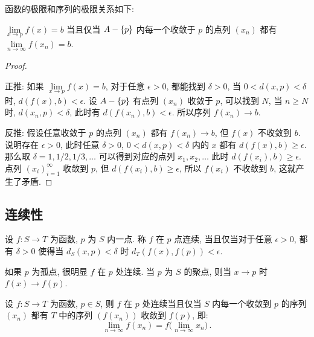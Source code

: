 \documentclass[UTF8]{ctexart}
\theoremstyle{mystyle}
\DeclarePairedDelimiter\set{\lbrace}{\rbrace}
\begin{document}
函数的极限和序列的极限关系如下:
\begin{proposition}
    $ \lim\limits_{x \to p} f(x) = b $ 当且仅当 $ A - \set{p} $ 内每一个收敛于 $ p $ 的点列 $ (x_n) $ 都有 $ \lim\limits_{n \to \infty} f(x_n) = b $.
\end{proposition}

\begin{proof} \ 

    正推: 如果 $ \lim\limits_{x \to p} f(x) = b $, 对于任意 $ \epsilon > 0 $, 都能找到 $ \delta > 0 $, 当 $ 0 < d(x, p) < \delta $ 时, $ d(f(x), b) < \epsilon $. 设 $ A - \set{p} $ 有点列 $ (x_n) $ 收敛于 $ p $, 可以找到 $ N $, 当 $ n \geqslant N $ 时, $ d(x_n, p) < \delta $, 此时有 $ d(f(x_n), b) < \epsilon $. 所以序列 $ f(x_n) \to b $.

    反推: 假设任意收敛于 $ p $ 的点列 $ (x_n) $ 都有 $ f(x_n) \to b $, 但 $ f(x) $ 不收敛到 $ b $. 说明存在 $ \epsilon > 0 $, 此时任意 $ \delta > 0 $, $ 0 < d(x, p) < \delta $ 内的 $ x $ 都有 $ d(f(x), b) \geqslant \epsilon $. 那么取 $ \delta = 1, 1/2, 1/3, \dots $ 可以得到对应的点列 $ x_1, x_2, \dots $ 此时 $ d(f(x_i), b) \geqslant \epsilon $. 点列 $ (x_i)_{i = 1}^{\infty} $ 收敛到 $ p $, 但 $ d(f(x_i), b) \geqslant \epsilon $, 所以 $ f(x_i) $ 不收敛到 $ b $, 这就产生了矛盾.
\end{proof}

\subsection{连续性}
\begin{definition}
    设 $ f \colon S \to T $ 为函数, $ p $ 为 $ S $ 内一点. 称 $ f $ 在 $ p $ 点连续, 当且仅当对于任意 $ \epsilon > 0 $, 都有 $ \delta > 0 $ 使得当 $ d_S(x, p) < \delta $ 时 $ d_T(f(x), f(p)) < \epsilon $.
\end{definition}

如果 $ p $ 为孤点, 很明显 $ f $ 在 $ p $ 处连续. 当 $ p $ 为 $ S $ 的聚点, 则当 $ x \to p $ 时 $ f(x) \to f(p) $.

\begin{proposition}
    设 $ f \colon S \to T $ 为函数, $ p \in S $, 则 $ f $ 在 $ p $ 处连续当且仅当 $ S $ 内每一个收敛到 $ p $ 的序列 $ (x_n) $ 都有 $ T $ 中的序列 $ (f(x_n)) $ 收敛到 $ f(p) $, 即:
    \[ 
        \lim_{n \to \infty} f(x_n) = f \big( \lim_{n \to \infty} x_n \big) \,.
    \]
\end{proposition}
\end{document}
